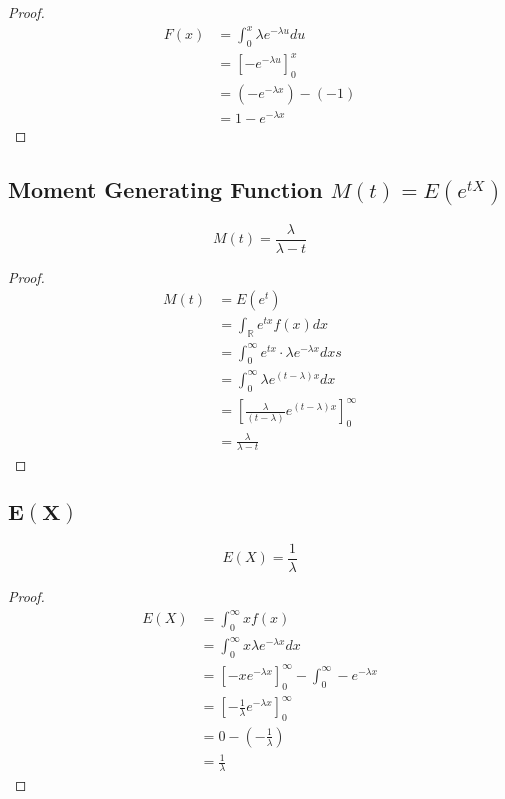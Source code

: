 \documentclass[12pt]{article}
\begin{document}
\begin{proof}
  \begin{align*}
    F(x) &= \int_{0}^{x} \lambda e^{-\lambda u} du \\
         &= \left[-e^{-\lambda u} \right]_{0}^{x} \\
         &= (-e^{-\lambda x}) - (-1) \\
         &= 1 - e^{-\lambda x}
  \end{align*}
\end{proof}
\subsection{Moment Generating Function $M(t)=E(e^{tX})$}

\begin{equation*}
    M(t)=\frac{\lambda}{\lambda -t}
\end{equation*}
\begin{proof}
\begin{align*}
  M(t) &= E(e^{t}) \\
       &= \int_{\mathbb{R}} e^{tx} f(x) dx \\
       &= \int_{0}^{\infty} e^{tx} \cdot \lambda e^{-\lambda x} dxs \\
       &= \int_{0}^{\infty} \lambda e^{(t-\lambda)x} dx \\
       &= \left[\frac{\lambda}{(t-\lambda)}e^{(t-\lambda)x} \right]_{0}^{\infty} \\
       &= \frac{\lambda}{\lambda -t}
\end{align*}
\end{proof}
\subsection{$\bm{E(X)}$}

\begin{equation*}
  E(X) = \frac{1}{\lambda}
\end{equation*}

\begin{proof}
  \begin{align*}
    E(X) &= \int_{0}^{\infty} x f(x)\\
         &= \int_{0}^{\infty} x \lambda e^{-\lambda x} dx \\
         &= [-xe^{-\lambda x}]_{0}^{\infty} - \int_{0}^{\infty} -e^{-\lambda x} \\
         &= \left[-\frac{1}{\lambda} e^{-\lambda x} \right]_{0}^{\infty} \\
         &= 0 - \left(-\frac{1}{\lambda}\right) \\
         &= \frac{1}{\lambda}
  \end{align*}
\end{proof}
\end{document}
